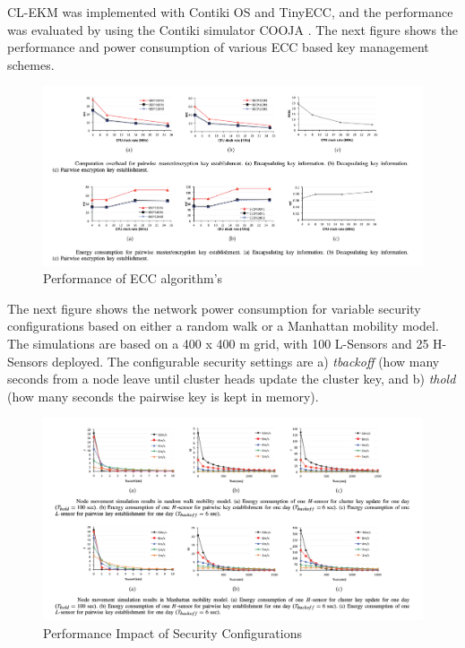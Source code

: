\documentclass[12pt,a4paper,twoside]{report}
\begin{document}
CL-EKM was implemented with Contiki OS and TinyECC, and the performance was evaluated by using the Contiki simulator COOJA \cite{seo;etal:2015}. The next figure shows the performance and power consumption of various ECC based key management schemes. \par
\begin{figure}[ht]
	\begin{center}
  \includegraphics[width=1.0\textwidth,natwidth=1496,natheight=706]{./figures/figure-06.png}
  \end{center}
  \caption{Performance of ECC algorithm's \cite{seo;etal:2015}}
  \label{fig:label}
\end{figure}
The next figure shows the network power consumption for variable security configurations based on either a random walk or a Manhattan mobility model. The simulations are based on a 400 x 400 m grid, with 100 L-Sensors and 25 H-Sensors deployed. The configurable security settings are a) \emph{tbackoff} (how many seconds from a node leave until cluster heads update the cluster key, and b) \emph{thold} (how many seconds the pairwise key is kept in memory).\par
\begin{figure}[ht]
	\begin{center}
  \includegraphics[width=1.0\textwidth,natwidth=1502,natheight=800]{./figures/figure-07.png}
  \end{center}
  \caption{Performance Impact of Security Configurations \cite{seo;etal:2015}}
  \label{fig:label}
\end{figure}
\end{document}
